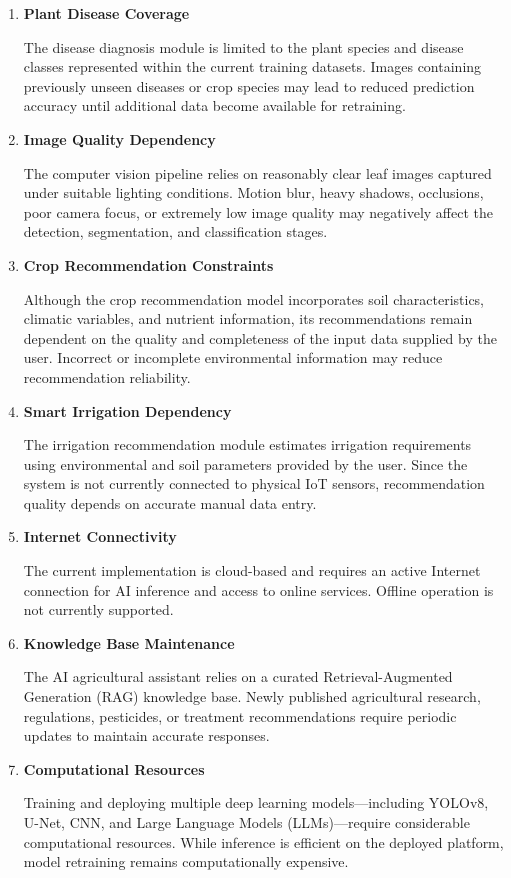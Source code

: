 \begin{enumerate}[leftmargin=*,label=\textbf{L\arabic*.}]

\item \textbf{Plant Disease Coverage}

The disease diagnosis module is limited to the plant species and disease classes represented within the current training datasets. Images containing previously unseen diseases or crop species may lead to reduced prediction accuracy until additional data become available for retraining.

\item \textbf{Image Quality Dependency}

The computer vision pipeline relies on reasonably clear leaf images captured under suitable lighting conditions. Motion blur, heavy shadows, occlusions, poor camera focus, or extremely low image quality may negatively affect the detection, segmentation, and classification stages.

\item \textbf{Crop Recommendation Constraints}

Although the crop recommendation model incorporates soil characteristics, climatic variables, and nutrient information, its recommendations remain dependent on the quality and completeness of the input data supplied by the user. Incorrect or incomplete environmental information may reduce recommendation reliability.

\item \textbf{Smart Irrigation Dependency}

The irrigation recommendation module estimates irrigation requirements using environmental and soil parameters provided by the user. Since the system is not currently connected to physical IoT sensors, recommendation quality depends on accurate manual data entry.

\item \textbf{Internet Connectivity}

The current implementation is cloud-based and requires an active Internet connection for AI inference and access to online services. Offline operation is not currently supported.

\item \textbf{Knowledge Base Maintenance}

The AI agricultural assistant relies on a curated Retrieval-Augmented Generation (RAG) knowledge base. Newly published agricultural research, regulations, pesticides, or treatment recommendations require periodic updates to maintain accurate responses.

\item \textbf{Computational Resources}

Training and deploying multiple deep learning models—including YOLOv8, U-Net, CNN, and Large Language Models (LLMs)—require considerable computational resources. While inference is efficient on the deployed platform, model retraining remains computationally expensive.

\end{enumerate}

